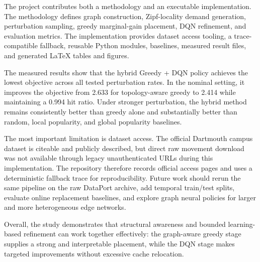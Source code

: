 \documentclass[11pt]{article}
\begin{document}
The project contributes both a methodology and an executable implementation. The methodology defines graph construction, Zipf-locality demand generation, perturbation sampling, greedy marginal-gain placement, DQN refinement, and evaluation metrics. The implementation provides dataset access tooling, a trace-compatible fallback, reusable Python modules, baselines, measured result files, and generated LaTeX tables and figures.

The measured results show that the hybrid Greedy + DQN policy achieves the lowest objective across all tested perturbation rates. In the nominal setting, it improves the objective from 2.633 for topology-aware greedy to 2.414 while maintaining a 0.994 hit ratio. Under stronger perturbation, the hybrid method remains consistently better than greedy alone and substantially better than random, local popularity, and global popularity baselines.

The most important limitation is dataset access. The official Dartmouth campus dataset is citeable and publicly described, but direct raw movement download was not available through legacy unauthenticated URLs during this implementation. The repository therefore records official access pages and uses a deterministic fallback trace for reproducibility. Future work should rerun the same pipeline on the raw DataPort archive, add temporal train/test splits, evaluate online replacement baselines, and explore graph neural policies for larger and more heterogeneous edge networks.

Overall, the study demonstrates that structural awareness and bounded learning-based refinement can work together effectively: the graph-aware greedy stage supplies a strong and interpretable placement, while the DQN stage makes targeted improvements without excessive cache relocation.



\end{document}
